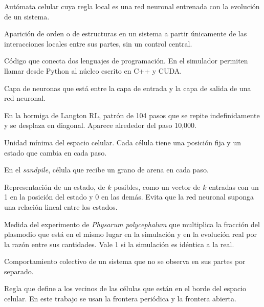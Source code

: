 \begin{description}[leftmargin=1.5em, labelindent=0pt, itemsep=4pt]
	\item[Autómata celular neuronal] Autómata celular cuya regla local es una red neuronal entrenada con la evolución de un sistema.

	\item[Autoorganización] Aparición de orden o de estructuras en un sistema a partir únicamente de las interacciones locales entre sus partes, sin un control central.

	\item[\textit{Bindings}] Código que conecta dos lenguajes de programación. En el simulador permiten llamar desde Python al núcleo escrito en C++ y CUDA.

	\item[Capa oculta] Capa de neuronas que está entre la capa de entrada y la capa de salida de una red neuronal.

	\item[Carretera] En la hormiga de Langton RL, patrón de 104 pasos que se repite indefinidamente y se desplaza en diagonal. Aparece alrededor del paso 10,000.

	\item[Célula] Unidad mínima del espacio celular. Cada célula tiene una posición fija y un estado que cambia en cada paso.

	\item[Célula generadora] En el \textit{sandpile}, célula que recibe un grano de arena en cada paso.

	\item[Codificación \textit{one-hot}] Representación de un estado, de $k$ posibles, como un vector de $k$ entradas con un 1 en la posición del estado y 0 en las demás. Evita que la red neuronal suponga una relación lineal entre los estados.

	\item[Coincidencia del plasmodio] Medida del experimento de \textit{Physarum polycephalum} que multiplica la fracción del plasmodio que está en el mismo lugar en la simulación y en la evolución real por la razón entre sus cantidades. Vale 1 si la simulación es idéntica a la real.

	\item[Comportamiento emergente] Comportamiento colectivo de un sistema que no se observa en sus partes por separado.

	\item[Condición de frontera] Regla que define a los vecinos de las células que están en el borde del espacio celular. En este trabajo se usan la frontera periódica y la frontera abierta.


\end{description}
